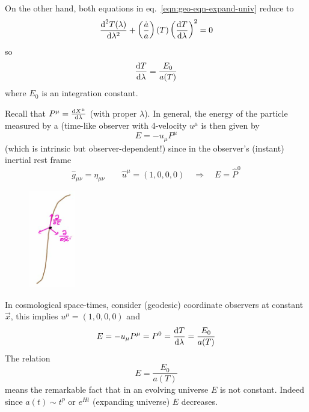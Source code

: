 \documentclass[../main/main.tex]{subfiles}
\begin{document}
\begin{example}
On the other hand, both equations in eq.~\eqref{eqn:geo-eqn-expand-univ} reduce to
\begin{equation}
\frac{\textup{d}^2T(\lambda)}{\textup{d}\lambda^2}+\left(\frac{\dot a}a\right)(T)\left(\frac{\textup{d} T}{\textup{d} \lambda}\right)^2=0
\end{equation}
so
\[\frac{\textup{d} T}{\textup{d} \lambda}=\frac{E_0}{a(T)}\]
where $E_0$ is an integration constant. 

Recall that $P^\mu=\frac{\textup{d} X^\mu}{\textup{d} \lambda}$ (with proper $\lambda$). In general, the energy of the particle measured by a (time-like observer with 4-velocity $u^\mu$ is then given by
\begin{equation}
E=-u_\mu P^\mu
\end{equation}
(which is intrinsic but observer-dependent!) since in the observer's (instant) inertial rest frame
\[\hat g_{\mu\nu}=\eta_{\mu\nu}\qquad\hat u^\mu=(1,0,0,0)\quad\Rightarrow\quad E=\hat P^0\]
%
\begin{figure}[H]
\centering
\includegraphics[width=2cm]{../img/expand-univ-obs-rest-frame.jpg}
\end{figure}

In cosmological space-times, consider (geodesic) coordinate observers at constant $\vec x$, this implies $u^\mu=(1,0,0,0)$ and 
\[E=-u_\mu P^\mu=P^0=\frac{\textup{d} T}{\textup{d} \lambda}=\frac{E_0}{a(T)}\]
The relation
\begin{equation}\boxed{
E=\frac{E_0}{a(T)}
}\end{equation}
means the remarkable fact that in an evolving universe $E$ is not constant. 
Indeed since $a(t)\sim t^p$ or $e^{Ht}$ (expanding universe) $E$ decreases.


\end{example}
\end{document}
